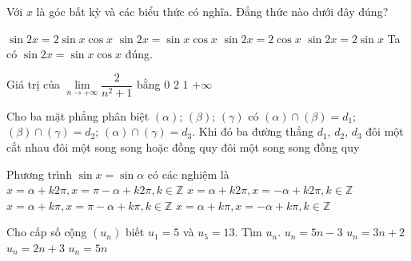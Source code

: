 \begin{ex}%
	Với $x$ là góc bất kỳ và các biểu thức có nghĩa. Đẳng thức nào dưới đây đúng?

	\choice
	{$\sin 2x = 2 \sin x \cos x$}
	{\True $\sin 2x = \sin x \cos x$}
	{$\sin 2x = 2 \cos x$}
	{$\sin 2x = 2 \sin x$}
	\loigiai
	{
		Ta có	$\sin 2x = \sin x \cos x$ đúng.
	}
\end{ex}

\begin{ex}%
	Giá trị của $\lim \limits_{n \to +\infty}\dfrac{2}{n^2+1}$ bằng
	\choice
	{\True $0$}
	{$2$}
	{$1$}
	{$+\infty$}
\end{ex}

\begin{ex}%
	Cho ba mặt phẳng phân biệt $(\alpha);\,(\beta);\,(\gamma)$ có $(\alpha)\cap(\beta)=d_1$; $(\beta)\cap(\gamma)=d_2$; $(\alpha)\cap(\gamma)=d_3$. Khi đó ba đường thẳng $d_1$, ${d_2}$, ${d_3}$
	\choice
	{đôi một cắt nhau}
	{\True đôi một song song hoặc đồng quy}
	{đôi một song song}
	{đồng quy}
\end{ex}

\begin{ex}%
	Phương trình $\sin x=\sin\alpha $ có các nghiệm là
	\choice
	{\True $x=\alpha+k 2 \pi, x=\pi-\alpha+k 2 \pi, k \in \mathbb{Z}$}
	{$x=\alpha+k 2 \pi, x=-\alpha+k 2 \pi, k \in \mathbb{Z}$}
	{$x=\alpha+k \pi, x=\pi-\alpha+k \pi, k \in \mathbb{Z}$}
	{$x=\alpha+k \pi, x=-\alpha+k \pi, k \in \mathbb{Z}$}
\end{ex}


\begin{ex}%
	Cho cấp số cộng $(u_n)$ biết $u_1=5$ và $u_5=13$. Tìm $u_n$.
	\choice
	{$u_n=5n-3$}
	{$u_n=3n+2$}
	{\True $u_n=2n+3$}
	{$u_n=5n$}
\end{ex}

